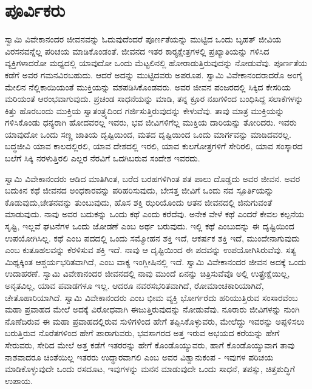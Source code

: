 
\chapter{ಪೂರ್ವಿಕರು}

ಸ್ವಾಮಿ ವಿವೇಕಾನಂದರ ಜೀವನವನ್ನು ಓದುವುದೆಂದರೆ ಪೂರ್ಣತೆಯನ್ನು ಮುಟ್ಟಿದ ಒಂದು ಬೃಹತ್ ಜೀವಿಯ ವಿರಸನವನ್ನೆಲ್ಲ ಪರಿಚಯ ಮಾಡಿಕೊಂಡಂತೆ. ಜೀವನದ ಇತರ ಕಾರ‍್ಯಕ್ಷೇತ್ರಗಳಲ್ಲಿ ಪ್ರಖ್ಯಾತಿಯನ್ನು ಗಳಿಸಿದ ವ್ಯಕ್ತಿಗಳಾದರೋ ಮಧ್ಯದಲ್ಲಿ ಯಾವುದೋ ಒಂದು ಮೆಟ್ಟಲಿನಲ್ಲಿ ಹೋರಾಡುತ್ತಿರುವುದನ್ನು ನೋಡುವೆವು. ಪೂರ್ಣತೆಯ ಕಡೆಗೆ ಅವರ ಗಮನವಿರಬಹುದು. ಆದರೆ ಅದನ್ನು ಮುಟ್ಟಿದವರು ಅಪರೂಪ. ಸ್ವಾಮಿ ವಿವೇಕಾನಂದರಾದರೊ ಅಂಗೈ ಮೇಲಿನ ನೆಲ್ಲಿಕಾಯಿಯಂತೆ ಮುಕ್ತಿಯನ್ನು ವಶಪಡಿಸಿಕೊಂಡವರು. ಅವರ ಜೀವನ ಪಂಜರದಲ್ಲಿ ಸಿಕ್ಕಿದ ಕೇಸರಿಯ ಮರಿಯಂತೆ ಆರಂಭವಾಗುವುದು. ಪ್ರಚಂಡ ಸಾಧನೆಯನ್ನು ಮಾಡಿ, ತನ್ನ ಕ್ರೂರ ನಖಗಳಿಂದ ಬಂಧಿಸಿದ್ದ ಸಲಾಕೆಗಳನ್ನು ಕಿತ್ತು ಹೊರಬಂದು ಮುಕ್ತಿಯ ಸ್ವಾತಂತ್ರ್ಯದಿಂದ ಗರ್ಜಿಸುತ್ತಿರುವುದನ್ನು ಕೇಳುವೆವು. ತಾವು ಮಾತ್ರ ಮುಕ್ತಿಯನ್ನು ಗಳಿಸಿಕೊಂಡು ಧನ್ಯರಾಗಿ ಹೋದವರಲ್ಲ ಇವರು, ಭವ ಜೀವಿಗಳಿಗೆಲ್ಲ ಮುಕ್ತಿಯ ದಾರಿಯನ್ನು ತೋರಿದರು. ಇವರು ಯಾವುದೋ ಒಂದು ಸಣ್ಣ ಜಾತಿಯ ದೃಷ್ಟಿಯಿಂದ, ಮತದ ದೃಷ್ಟಿಯಿಂದ ಒಂದು ಮಾರ್ಗವನ್ನು ಮಾಡಿದವರಲ್ಲ. ಬದ್ಧಜೀವಿ ಯಾವ ಕಾಲದಲ್ಲಿರಲಿ, ಯಾವ ದೇಶದಲ್ಲಿ ಇರಲಿ, ಯಾವ ಕುಲಗೋತ್ರಗಳಿಗೆ ಸೇರಿರಲಿ, ಯಾವ ಸಂಸ್ಕಾರದ ಬಲೆಗೆ ಸಿಕ್ಕಿ ನರಳುತ್ತಿರಲಿ ಎಲ್ಲರ ನೆರವಿಗೆ ಒದಗಿಬರುವ ಸಂದೇಶ ಇವರದು.

ಸ್ವಾಮಿ ವಿವೇಕಾನಂದರು ಆಡಿದ ಮಾತಿಗಿಂತ, ಬರೆದ ಬರಹಗಳಿಗಿಂತ ಶತ ಪಾಲು ದೊಡ್ಡದು ಅವರ ಜೀವನ. ಅವರ ಬದುಕಿನ ಕಥೆ ಜೀವನದ ಅಂಧಕಾರವನ್ನು ಪರಿಹರಿಸುವುದು, ಬೇಸತ್ತ ಜೀವಿಗೆ ಒಂದು ನವ ಸ್ಪೂರ್ತಿಯನ್ನು ಕೊಡುವುದು,ಚೇತನವನ್ನು ತುಂಬುವುದು, ಹೊಸ ಶಕ್ತಿ ಝರಿಯೊಂದು ಆತನ ಜೀವನದಲ್ಲಿ ಜಿನುಗುವಂತೆ ಮಾಡುವುದು. ನಾವು ಅವರ ಬದುಕನ್ನು ಒಂದು ಕಥೆ ಎಂದು ಕರೆದೆವು. ಅನೇಕ ವೇಳೆ ಕಥೆ ಎಂದರೆ ಕೇವಲ ಕಲ್ಪನೆಯ ಸೃಷ್ಟಿ, ಇಲ್ಲವೆ ಘಟನೆಗಳ ಒಂದು ಜೋಡಣೆ ಎಂಬ ಅರ್ಥ ಬರುವುದು. ಇಲ್ಲಿ ಕಥೆ ಎಂಬುದನ್ನು ಈ ದೃಷ್ಟಿಯಿಂದ ಉಪಯೋಗಿಸಿಲ್ಲ. ಕಥೆ ಎಂಬ ಪದದಲ್ಲಿ ಒಂದು ಸಮ್ಮೋಹನ ಶಕ್ತಿ ಇದೆ, ಆಕರ್ಷಕ ಶಕ್ತಿ ಇದೆ, ಮುಂದೇನಾಗುವುದು ಎಂಬ ಕುತೂಹಲವನ್ನು ಕೆರಳಿಸುವ ಶಕ್ತಿ ಇದೆ. ನಾವು ಆ ದೃಷ್ಟಿಯಿಂದ ಈ ಪದವನ್ನು ಉಪಯೋಗಿಸಿರುವೆವು. ಸತ್ಯ ಮಿಥ್ಯಕ್ಕಿಂತ ಆಶ್ಚರ್ಯಭರಿತವಾಗಿದೆ, ಎಂಬ ವಾಕ್ಯ ಇಂಗ್ಲೀಷಿನಲ್ಲಿ ಇದೆ. ಸ್ವಾಮಿ ವಿವೇಕಾನಂದರ ಜೀವನ ಅದಕ್ಕೆ ಒಂದು ಉದಾಹರಣೆ. ಸ್ವಾಮಿ ವಿವೇಕಾನಂದರ ಜೀವನದಲ್ಲಿ ನಾವು ಮುಂದೆ ಏನನ್ನು ಚಿತ್ರಿಸುವೆವೊ ಅಲ್ಲಿ ಉತ್ಪ್ರೇಕ್ಷೆಯಿಲ್ಲ, ಅನೃತವಿಲ್ಲ, ಯಾವ ಪವಾಡಗಳೂ ಇಲ್ಲ. ಆದರೂ ನವರಸಭರಿತವಾಗಿದೆ, ರೋಮಾಂಚಕಾರಿಯಾಗಿದೆ, ಚೇತೊಹಾರಿಯಾಗಿದೆ. ಸ್ವಾಮಿ ವಿವೇಕಾನಂದರು ಎಂಬ ಭೀಮ ವ್ಯಕ್ತಿ ಭೋರ್ಗರೆದು ಹರಿಯುತ್ತಿರುವ ಸಂಸಾರವೆಂಬ ಮಹಾ ಪ್ರವಾಹದ ಮೇಲೆ ಅದಕ್ಕೆ ವಿರೋಧವಾಗಿ ಈಜುತ್ತಿರುವುದನ್ನು ನೋಡುವೆವು. ನೂರಾರು ಜೀವಿಗಳನ್ನು ನುಂಗಿ ನೊಣೆದಿರುವ ಈ ಮಹಾ ಪ್ರವಾಹದಲ್ಲಿರುವ ಸುಳಿಗಳಿಂದ ಹೇಗೆ ತಪ್ಪಿಸಿಕೊಳ್ಳುವರು, ಮೇಲೆದ್ದು ಇವರನ್ನು ಅಪ್ಪಳಿಸಲು ಬರುತ್ತಿರುವ ನೊರೆತಗಳಿಂದ ಹೇಗೆ ಪಾರಾಗುವರು, ಭವಸಾಗರದ ಅತ್ತ ಇರುವ ಅಭಯದ ಕರೆಯನ್ನು ಹೇಗೆ ಸೇರುವರು, ಸೇರಿದ ಮೇಲೆ ಅತ್ತ ಕಡೆಗೆ ಇತರರನ್ನು ಹೇಗೆ ಕೊಂಡೊಯ್ಯುವರು, ಹಾಗೆ ಕೊಂಡೊಯ್ಯುವಾಗ ತಾವು ನಾಶವಾದರೂ ಚಿಂತೆಯಿಲ್ಲ ಇತರರು ಉದ್ಧಾರವಾಗಲಿ ಎಂಬ ಅವರ ವಿಶ್ವಾನುಕಂಪ - ಇವುಗಳ ಪರಿಚಯ ಮಾಡಿಕೊಳ್ಳುವುದೇ ಒಂದು ರಸದೂಟ, ಇವುಗಳನ್ನು ಮನನ ಮಾಡುವುದೇ ಒಂದು ಸಾಧನೆ, ತಪಸ್ಸು, ಚಿತ್ತಶುದ್ಧಿಗೆ ಉಪಾಯ. 

